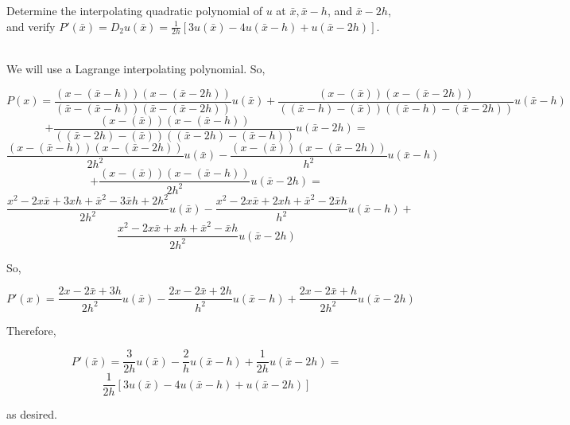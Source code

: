 Determine the interpolating quadratic polynomial of $u$ at $\bar{x}, \bar{x}-h$, and $\bar{x}-2h$, and
verify $P'(\bar{x})=D_2u(\bar{x})=\frac{1}{2h}[3u(\bar{x})-4u(\bar{x}-h)+u(\bar{x}-2h)]$.\\


\begin{solution}\renewcommand{\qedsymbol}{}\ \\
    We will use a Lagrange interpolating polynomial. So,
    
    $$P(x)=\frac{(x-(\bar{x}-h))(x-(\bar{x}-2h))}{(\bar{x}-(\bar{x}-h))(\bar{x}-(\bar{x}-2h))}u(\bar{x})
    +\frac{(x-(\bar{x}))(x-(\bar{x}-2h))}{((\bar{x}-h)-(\bar{x}))((\bar{x}-h)-(\bar{x}-2h))}
    u(\bar{x}-h)$$
    $$+\frac{(x-(\bar{x}))(x-(\bar{x}-h))}{((\bar{x}-2h)-(\bar{x}))((\bar{x}-2h)-(\bar{x}-h))}
    u(\bar{x}-2h)=$$
    $$\frac{(x-(\bar{x}-h))(x-(\bar{x}-2h))}{2h^2}u(\bar{x})
    -\frac{(x-(\bar{x}))(x-(\bar{x}-2h))}{h^2}u(\bar{x}-h)$$
    $$+\frac{(x-(\bar{x}))(x-(\bar{x}-h))}{2h^2}u(\bar{x}-2h)=$$
    $$\frac{x^2-2x\bar{x}+3xh+\bar{x}^2-3\bar{x}h+2h^2}{2h^2}u(\bar{x})
    -\frac{x^2-2x\bar{x}+2xh+\bar{x}^2-2\bar{x}h}{h^2}u(\bar{x}-h)+$$
    $$\frac{x^2-2x\bar{x}+xh+\bar{x}^2-\bar{x}h}{2h^2}u(\bar{x}-2h)$$
    
    So,
    
    $$P'(x)=\frac{2x-2\bar{x}+3h}{2h^2}u(\bar{x})-\frac{2x-2\bar{x}+2h}{h^2}u(\bar{x}-h)+
    \frac{2x-2\bar{x}+h}{2h^2}u(\bar{x}-2h)$$
    
    Therefore,
    
    $$P'(\bar{x})=\frac{3}{2h}u(\bar{x})-\frac2hu(\bar{x}-h)+\frac{1}{2h}u(\bar{x}-2h)=$$
    $$\frac{1}{2h}[3u(\bar{x})-4u(\bar{x}-h)+u(\bar{x}-2h)]$$
    
    as desired.

\end{solution}
